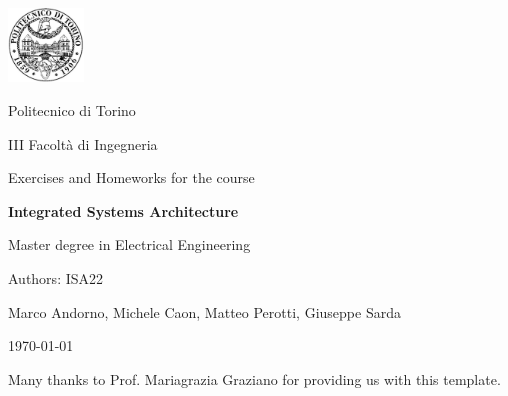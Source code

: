 \documentclass[10pt,  english, makeidx, a4paper, titlepage, oneside]{book}
\begin{document}
\frontmatter
\begin{titlepage}
\vspace{2cm}
\centerline{
\includegraphics[width=2cm]{./logopoli}}  
\centerline{\LARGE Politecnico di Torino}
\bigskip
\centerline{\Large III Facolt\`a di Ingegneria}
\vspace{4cm}
\centerline{\Huge\sf Exercises and Homeworks for the course}
\bigskip
\centerline{\Huge\bfseries\sf Integrated Systems Architecture}
\vspace{2cm}
\centerline{\LARGE Master degree in Electrical Engineering}
\vspace{4.4cm}
%
\centerline{\Large Authors: ISA22}
\vspace{2cm}
%
%
\centerline{Marco Andorno, Michele Caon, Matteo Perotti, Giuseppe Sarda}
%
\vspace{2cm}
\centerline{\today}
\vspace{1cm}
{\scriptsize Many thanks to Prof. Mariagrazia Graziano for providing us with this template.}
\end{titlepage}

\tableofcontents

% 
\mainmatter
\lstset{language=VHDL}


\end{document}
